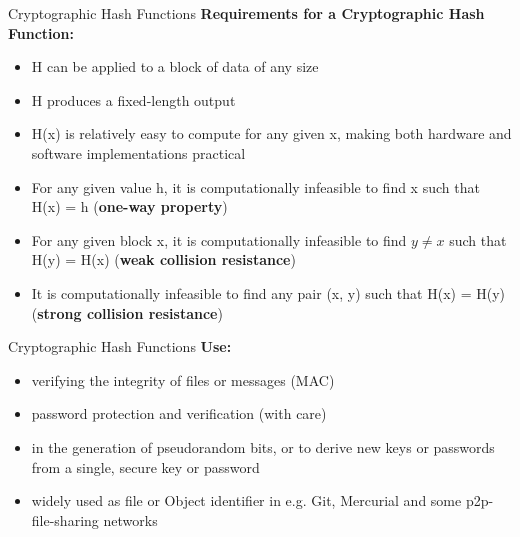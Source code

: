 \documentclass[pdf]{beamer}
\begin{document}
\begin{frame}{Cryptographic Hash Functions}
\textbf{Requirements for a Cryptographic Hash Function:}
\begin{itemize}
\item
H can be applied to a block of data of any size

\item
H produces a fixed-length output

\item
H(x) is relatively easy to compute for any given x, making both hardware and software implementations practical

\item
For any given value h, it is computationally infeasible to find x such that H(x) = h (\textbf{one-way property})

\item
For any given block x, it is computationally infeasible to find $y \neq x$ such that H(y) = H(x) (\textbf{weak collision resistance})

\item
It is computationally infeasible to find any pair (x, y) such that H(x) = H(y) (\textbf{strong collision resistance})

\end{itemize}
\end{frame}



\begin{frame}{Cryptographic Hash Functions}
\textbf{Use:}
\begin{itemize}
\item
verifying the integrity of files or messages (MAC)

\item
password protection and verification (with care)

\item
in the generation of pseudorandom bits, or to derive new keys or passwords from a single, secure key or password

\item
widely used as file or Object identifier in e.g. Git, Mercurial and some p2p-file-sharing networks

\end{itemize}
\end{frame}
\end{document}
